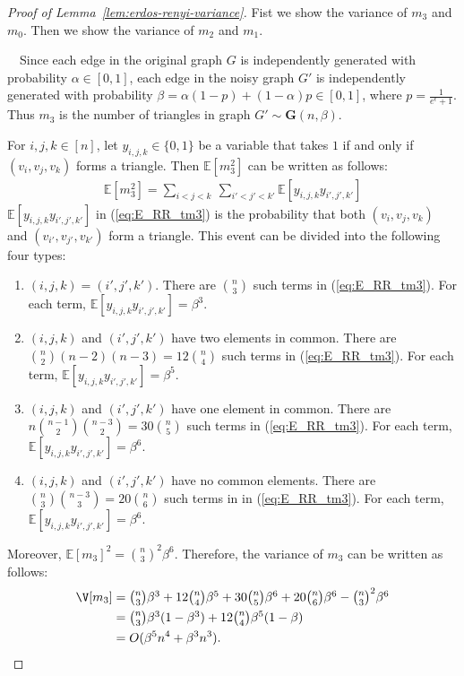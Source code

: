 \begin{proof}[Proof of Lemma~\ref{lem:erdos-renyi-variance}]
Fist we show the variance of $m_3$ and $m_0$. 
Then we show the variance of $m_2$ and $m_1$.

\smallskip
{}~~Since each edge in the original graph $G$ is independently generated with probability $\alpha \in [0,1]$, each edge in the noisy graph $G'$ is independently generated with probability $\beta = \alpha (1-p) + (1 - \alpha) p \in [0,1]$, where $p=\frac{1}{e^\epsilon+1}$. 
Thus $m_3$ is the number of triangles in graph $G' \sim \textbf{G}(n,\beta)$.

For $i,j,k \in [n]$, let $y_{i,j,k} \in \{0,1\}$ be a variable that takes $1$ if and only if 
$(v_i, v_j, v_k)$ forms a triangle. 
Then $\mathbb{E}[m_3^2]$ can be written as follows:
\begin{align}
  \mathbb{E}[m_3^2] = \sum_{i<j<k} ~ \sum_{i'<j'<k'}
  \mathbb{E}[y_{i,j,k} y_{i',j',k'}] 
  \label{eq:E_RR_tm3}
\end{align}
$\mathbb{E}[y_{i,j,k} y_{i',j',k'}]$ in (\ref{eq:E_RR_tm3}) is the probability that both $(v_i,v_j,v_k)$ and $(v_{i'},v_{j'},v_{k'})$ form a triangle. 
This event can be divided into the following four types:
\begin{enumerate}
\item $(i,j,k)=(i',j',k')$. There are $\binom{n}{3}$ such terms in (\ref{eq:E_RR_tm3}). 
For each term, $\mathbb{E}[y_{i,j,k} y_{i',j',k'}] = \beta^3$.
\item $(i,j,k)$ and $(i',j',k')$ have two elements in common. 
There are $\binom{n}{2} (n-2) (n-3) = 12\binom{n}{4}$ such terms in (\ref{eq:E_RR_tm3}). 
For each term, $\mathbb{E}[y_{i,j,k} y_{i',j',k'}] = \beta^5$. 
\item $(i,j,k)$ and $(i',j',k')$ have one element in common. 
There are $n \binom{n-1}{2} \binom{n-3}{2} = 30\binom{n}{5}$ such terms in (\ref{eq:E_RR_tm3}). 
For each term, $\mathbb{E}[y_{i,j,k} y_{i',j',k'}] = \beta^6$. 
\item $(i,j,k)$ and $(i',j',k')$ have no common elements. 
There are $\binom{n}{3} \binom{n-3}{3} = 20\binom{n}{6}$ such terms in in (\ref{eq:E_RR_tm3}). 
For each term, $\mathbb{E}[y_{i,j,k} y_{i',j',k'}] = \beta^6$. 
\end{enumerate}
Moreover, $\mathbb{E}[m_3]^2 = \binom{n}{3}^2 \beta^6$. 
Therefore, the variance of $m_3$ can be written as follows:
\begin{align*}
    \V[m_3] 
    &= \textstyle{\binom{n}{3} \beta^3 + 12\binom{n}{4} \beta^5 + 30\binom{n}{5} \beta^6 + 20\binom{n}{6} \beta^6 - \binom{n}{3}^2 \beta^6} \\
    &= \textstyle{\binom{n}{3} \beta^3 (1-\beta^3) + 12\binom{n}{4}\beta^5(1-\beta)} \\
    &= O(\beta^5 n^4 + \beta^3 n^3).
\end{align*}


\end{proof}
